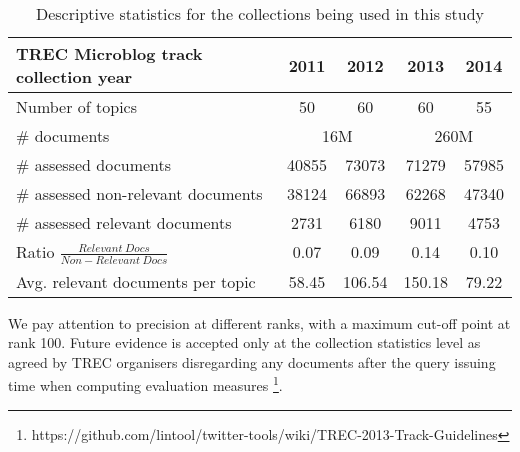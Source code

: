 \begin{table}[]



\caption{Descriptive statistics for the collections being used in this study}

 

  	\centering

   \begin{tabular}{l||c|c|c|c} 



    \hline

    

TREC Microblog track collection year & 2011 & 2012 & 2013 & 2014 \tabularnewline



	\hline

Number of topics   & 50 & 60 & 60 & 55 \tabularnewline

        \hline

\# documents & \multicolumn{2}{c|}{16M} & \multicolumn{2}{c}{260M}  \tabularnewline

        \hline

\# assessed documents   & 40855 &  73073  & 71279 & 57985 \tabularnewline

        \hline

\# assessed non-relevant documents & 38124 & 66893 & 62268 & 47340 \tabularnewline

	\hline

\# assessed relevant documents  & 2731 &  6180 & 9011 & 4753\tabularnewline

	\hline

 Ratio \(\frac{Relevant~Docs}{Non-Relevant~Docs}\) & 0.07 &  0.09 & 0.14 & 0.10\tabularnewline

	\hline

 Avg. relevant documents per topic   & 58.45 &  106.54 & 150.18 & 79.22 \tabularnewline

	\hline

   \end{tabular}


   \label{collections}

     \vspace{0.5cm}

 \end{table}



 We pay attention to precision at different ranks, with a maximum cut-off point at rank 100. Future evidence is accepted only at the collection statistics level as agreed by TREC organisers disregarding any documents after the query issuing time when computing evaluation measures \footnote{https://github.com/lintool/twitter-tools/wiki/TREC-2013-Track-Guidelines}.\\

